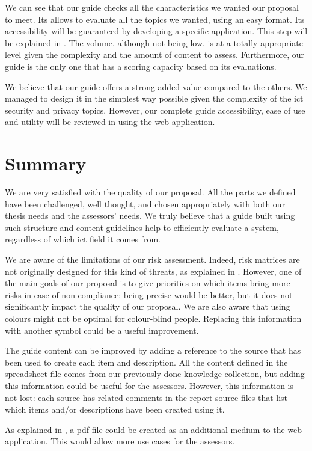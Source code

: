 We can see that our guide checks all the characteristics we wanted our proposal to meet. Its allows to evaluate all the topics we wanted, using an easy format. Its accessibility will be guaranteed by developing a specific application. This step will be explained in . The volume, although not being low, is at a totally appropriate level given the complexity and the amount of content to assess. Furthermore, our guide is the only one that has a scoring capacity based on its evaluations.

We believe that our guide offers a strong added value compared to the others. We managed to design it in the simplest way possible given the complexity of the \gls{ict} security and privacy topics. However, our complete guide accessibility, ease of use and utility will be reviewed in  using the web application.

\section{Summary}
\label{sec:proposal_summary}

We are very satisfied with the quality of our proposal. All the parts we defined have been challenged, well thought, and chosen appropriately with both our thesis needs and the assessors' needs. We truly believe that a guide built using such structure and content guidelines help to efficiently evaluate a system, regardless of which \gls{ict} field it comes from.

We are aware of the limitations of our risk assessment. Indeed, risk matrices are not originally designed for this kind of threats, as explained in . However, one of the main goals of our proposal is to give priorities on which items bring more risks in case of non-compliance: being precise would be better, but it does not significantly impact the quality of our proposal. We are also aware that using colours might not be optimal for colour-blind people. Replacing this information with another symbol could be a useful improvement.

The guide content can be improved by adding a reference to the source that has been used to create each item and description. All the content defined in the spreadsheet file comes from our previously done knowledge collection, but adding this information could be useful for the assessors. However, this information is not lost: each source has related comments in the report source files that list which items and/or descriptions have been created using it.

As explained in , a \gls{pdf} file could be created as an additional medium to the web application. This would allow more use cases for the assessors.